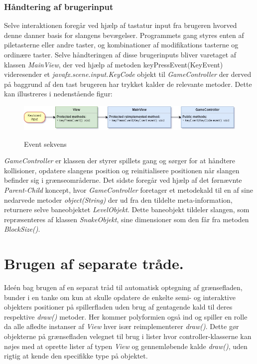 \documentclass[]{article}
\begin{document}
	\subsubsection{Håndtering af brugerinput}
	
	Selve interaktionen foregår ved hjælp af tastatur input fra brugeren hvorved denne danner basis for slangens bevægelser. Programmets gang styres enten af piletasterne eller andre taster, og kombinationer af modifikations tasterne og ordinære taster. Selve håndteringen af disse brugerinputs bliver varetaget af klassen \textit{MainView}, der ved hjælp af metoden keyPressEvent(KeyEvent) videresender et \textit{javafx.scene.input.KeyCode}  objekt til \textit{GameController} der derved på baggrund af den tast brugeren har trykket kalder de relevante metoder. Dette kan illustreres i nedenstående figur:
	
	
	\begin{figure}[h!]
		\centering
		\includegraphics[width=\linewidth]{Event_sequence.jpg}
		\label{fig:Event}
		\caption{Event sekvens}
	\end{figure}
	
	\textit{GameController} er klassen der styrer spillets gang og sørger for at håndtere kollisioner, opdatere slangens position og reinitialisere positionen når slangen befinder sig i grænseområderne. Det sidste foregår ved hjælp af det førnævnte \textit{Parent-Child} koncept, hvor \textit{GameController} foretager et metodekald til en af sine nedarvede metoder \textit{object(String)} der ud fra den tildelte meta-information, returnere selve baneobjektet \textit{LevelObjekt}. Dette baneobjekt tildeler slangen, som repræsenteres af klassen \textit{SnakeObjekt}, sine dimensioner som den får fra metoden \textit{BlockSize()}.\\
	
	\section{Brugen af separate tråde.}
	
	Ideén bag brugen af en separat tråd til automatisk optegning af grænsefladen, bunder i en tanke om kun at skulle opdatere de enkelte semi- og interaktive objekters positioner på spillerfladen uden brug af gentagende kald til deres respektive \textit{draw()} metoder. Her kommer polyformien også ind og spiller en rolle da alle afledte instanser af \textit{View} hver især reimplementerer \textit{draw()}. Dette gør objekterne på grænsefladen velegnet til brug i lister hvor controller-klasserne kan nøjes med at oprette lister af typen \textit{View} og gennemløbende kalde \textit{draw()}, uden rigtig at kende den specifikke type på objektet. 
	
\end{document}
